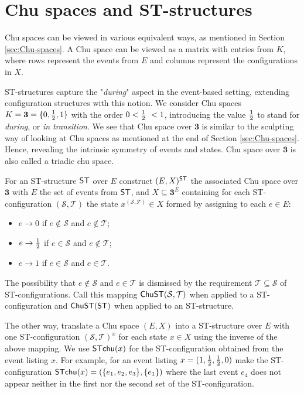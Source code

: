 \section{Chu spaces and ST-structures}
\label{sec:Chu-spaces-and-ST-structures}
    Chu spaces can be viewed in various equivalent ways, as mentioned in Section \ref{sec:Chu-spaces}. A Chu space can be viewed as a matrix with entries from $K$, where rows represent the events from $E$ and columns represent the configurations in $X$.
    
    ST-structures capture the "\emph{during}" aspect in the event-based setting, extending configuration structures with this notion. We consider Chu spaces $K= \mathbf{3}= \{0, \frac{1}{2} , 1\}$ with the order $0 < \frac{1}{2}\ < 1$, introducing the value $\frac{1}{2}$ to stand for \textit{during}, or \textit{in transition}. We see that Chu space over $\mathbf{3}$ is similar to the sculpting way of looking at Chu spaces as mentioned at the end of Section \ref{sec:Chu-spaces}. Hence, revealing the intrinsic symmetry of events and states. Chu space over $\mathbf{3}$ is also called a triadic chu space.


    \begin{definition}
        \label{def:ST-to-Chu}
        For an ST-structure $\mathsf{ST}$ over $E$ construct $(E,X)^{\mathsf{ST}}$ the associated Chu space over $\mathbf{3}$ with $E$ the set of events from $\mathsf{ST}$, and $X\subseteq \mathbf3^{E}$ containing for each ST-configuration $(\mathcal{S},\mathcal{T})$ the state $x^{(\mathcal{S},\mathcal{T})}\in X$ formed by assigning to each $e\in E$:
  
        \begin{itemize}
            \item $e \rightarrow 0$ if $e\not\in \mathcal{S}$ and $e\not\in \mathcal{T}$;
            \item $e \rightarrow \frac{1}{2}$ if $e\in \mathcal{S}$ and $e\not\in \mathcal{T}$;
            \item $e \rightarrow 1$ if $e\in \mathcal{S}$ and $e\in \mathcal{T}$.
        \end{itemize}
  
        The possibility that $e\notin \mathcal{S}$ and $e\in \mathcal{T}$ is dismissed by the requirement $\mathcal{T} \subseteq \mathcal{S}$ of ST-configurations.  Call this mapping $\mathsf{ChuST}(\mathcal{S},\mathcal{T})$ when applied to a ST-configuration and $\mathsf{ChuST}(\mathsf{ST})$ when applied to an ST-structure.
  
        The other way, translate a Chu space $(E,X)$ into a ST-structure over $E$ with one ST-configuration $(\mathcal{S},\mathcal{T})^{x}$ for each state $x\in X$ using the inverse of the above mapping.  We use $\mathsf{ST}\mathsf{chu}(x)$ for the ST-configuration obtained from the event listing $x$. For example, for an event listing $x=(1,\frac{1}{2},\frac{1}{2},0)$ make the ST-configuration $\mathsf{ST}\mathsf{chu}(x)=(\{e_{1},e_{2},e_{3}\},\{e_{1}\})$ where the last event $e_{4}$ does not appear neither in the first nor the second set of the ST-configuration.
    \end{definition}

